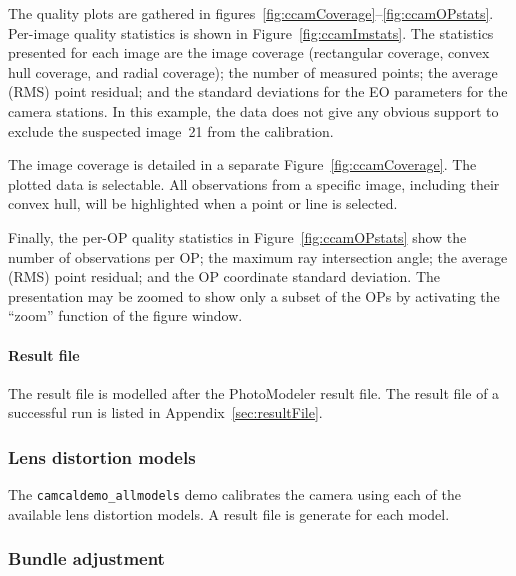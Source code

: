 \documentclass{article}
\begin{document}
The quality plots are gathered in
figures~\ref{fig:ccamCoverage}--\ref{fig:ccamOPstats}. Per-image quality
statistics is shown in Figure~\ref{fig:ccamImstats}. The statistics
presented for each image are the image coverage (rectangular coverage,
convex hull coverage, and radial coverage); the number of measured
points; the average (RMS) point residual; and the standard deviations
for the EO parameters for the camera stations. In this example, the
data does not give any obvious support to exclude the suspected
image~21 from the calibration.

The image coverage is detailed in a separate
Figure~\ref{fig:ccamCoverage}. The plotted data is selectable. All
observations from a specific image, including their convex hull, will
be highlighted when a point or line is selected.

Finally, the per-OP quality statistics in Figure~\ref{fig:ccamOPstats}
show the number of observations per OP; the maximum ray intersection
angle; the average (RMS) point residual; and the OP coordinate
standard deviation. The presentation may be zoomed to show only a
subset of the OPs by activating the ``zoom'' function of the figure
window.

\paragraph{Result file}
\label{sec:org7d13e46}

The result file is modelled after the PhotoModeler result file. The
result file of a successful run is listed in
Appendix~\ref{sec:resultFile}.

\subsubsection{Lens distortion models}
\label{sec:org0514317}

The \texttt{camcaldemo\_allmodels} demo calibrates the camera using
each of the available lens distortion models. A result file is
generate for each model.

\subsubsection{Bundle adjustment}
\label{sec:org0f19d6b}
\end{document}
